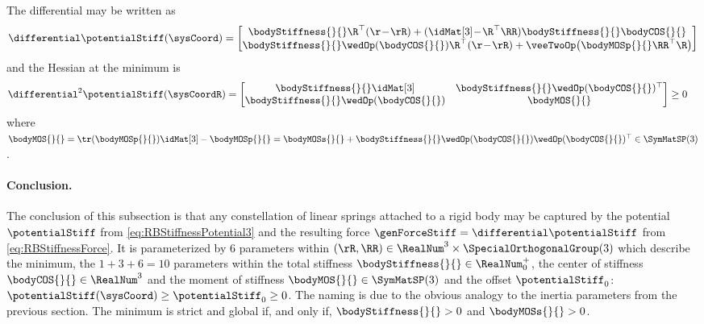 The differential may be written as
\begin{align}\label{eq:RBStiffnessForce}
 \differential\potentialStiff(\sysCoord) = \begin{bmatrix} \bodyStiffness{}{} \R^\top (\r\!-\!\rR) + (\idMat[3]\!-\!\R^\top\RR) \bodyStiffness{}{}\bodyCOS{}{} \\ \bodyStiffness{}{}\wedOp(\bodyCOS{}{}) \R^\top (\r\!-\!\rR) + \veeTwoOp\big(\bodyMOSp{}{} \RR^\top\R\big) \end{bmatrix}
\end{align}
and the Hessian at the minimum is
\begin{align} 
 \differential^2\potentialStiff(\sysCoordR) &= \begin{bmatrix} \bodyStiffness{}{}\idMat[3] & \bodyStiffness{}{} \wedOp(\bodyCOS{}{})^\top \\ \bodyStiffness{}{}\wedOp(\bodyCOS{}{}) & \bodyMOS{}{} \end{bmatrix} \geq 0
\end{align}
where $\bodyMOS{}{} = \tr(\bodyMOSp{}{})\idMat[3]-\bodyMOSp{}{} = \bodyMOSs{}{} + \bodyStiffness{}{} \wedOp(\bodyCOS{}{}) \wedOp(\bodyCOS{}{})^\top \in \SymMatSP(3)$.

\paragraph{Conclusion.}
The conclusion of this subsection is that any constellation of linear springs attached to a rigid body may be captured by the potential $\potentialStiff$ from \eqref{eq:RBStiffnessPotential3} and the resulting force $\genForceStiff = \differential\potentialStiff$ from \eqref{eq:RBStiffnessForce}.
It is parameterized by 6 parameters within $(\rR,\RR) \in \RealNum^3 \times \SpecialOrthogonalGroup(3)$ which describe the minimum, the $1+3+6=10$ parameters within the total stiffness $\bodyStiffness{}{}\in\RealNum^+_0$, the center of stiffness $\bodyCOS{}{} \in \RealNum^3$ and the moment of stiffness $\bodyMOS{}{} \in \SymMatSP(3)$ and the offset $\potentialStiff_0$: $\potentialStiff(\sysCoord) \geq \potentialStiff_0 \geq 0$.
The naming is due to the obvious analogy to the inertia parameters from the previous section.
The minimum is strict and global if, and only if, $\bodyStiffness{}{} > 0$ and $\bodyMOSs{}{} > 0$.



